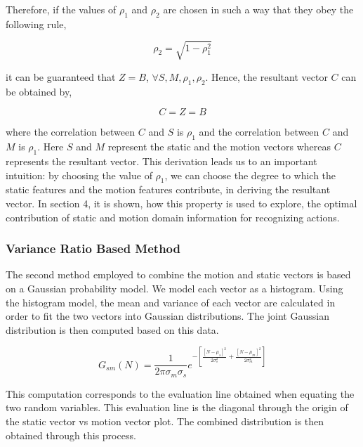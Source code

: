Therefore, if the values of $\rho_{1}$ and $\rho_{2}$ are chosen in such a way that they obey the following
rule,

\begin{equation}
\rho_{2} = \sqrt{1-\rho_{1}^2}
\end{equation}

it can be guaranteed that $Z = B$, $\forall S,M,\rho_{1},\rho_{2}$. Hence, the resultant vector $C$ can be obtained
by,

\begin{equation}
C=Z=B
\end{equation}

where the correlation between $C$ and $S$ is $\rho_{1}$ and the correlation between $C$ and $M$ is $\rho_{1}$. Here $S$ and $M$ represent the static and the
motion vectors whereas $C$ represents the resultant vector. This derivation
leads us to an important intuition: by choosing the value of $\rho_{1}$, we can
choose the degree to which the static features and the motion features contribute,
in deriving the resultant vector. In section 4, it is shown, how this property is used to explore, the optimal contribution of
static and motion domain information for recognizing actions.

\subsubsection{Variance Ratio Based Method}

The second method employed to combine the motion and static vectors is based on a Gaussian probability model. We model each vector as a histogram. %
Using the histogram model, the mean and variance of each vector are calculated in order to fit the two vectors into Gaussian distributions. The joint Gaussian distribution is then computed based on this data.

\begin{equation}
G_{sm}(N)= \frac{1}{2\pi\sigma_m\sigma_s} e^{-\left[\frac{[N-\mu_s]^2}{2\sigma_s^2}+ \frac{[N-\mu_m]^2}{2\sigma_m^2} \right]}
\end{equation}

This computation corresponds to the evaluation line obtained when equating the two random variables. This evaluation line is the diagonal through the origin of the static vector vs motion vector plot. The combined distribution is then obtained through this process.

